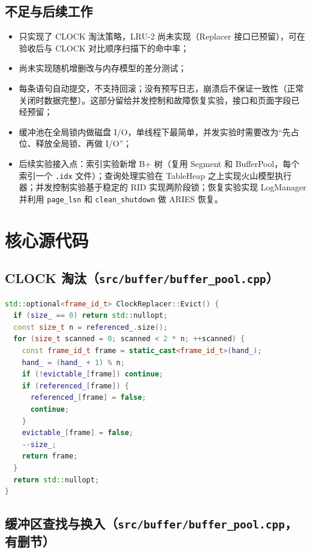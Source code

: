 \documentclass[11pt,a4paper]{ctexart}
\newcommand{\code}[1]{\texttt{#1}}
\begin{document}
\subsection{不足与后续工作}

\begin{itemize}
  \item 只实现了 CLOCK 淘汰策略，LRU-2 尚未实现（Replacer 接口已预留），可在验收后与 CLOCK 对比顺序扫描下的命中率；
  \item 尚未实现随机增删改与内存模型的差分测试；
  \item 每条语句自动提交，不支持回滚；没有预写日志，崩溃后不保证一致性（正常关闭时数据完整）。这部分留给并发控制和故障恢复实验，接口和页面字段已经预留；
  \item 缓冲池在全局锁内做磁盘 I/O，单线程下最简单，并发实验时需要改为“先占位、释放全局锁、再做 I/O”；
  \item 后续实验接入点：索引实验新增 B+ 树（复用 Segment 和 BufferPool，每个索引一个 \code{.idx} 文件）；查询处理实验在 TableHeap 之上实现火山模型执行器；并发控制实验基于稳定的 RID 实现两阶段锁；恢复实验实现 LogManager 并利用 \code{page\_lsn} 和 \code{clean\_shutdown} 做 ARIES 恢复。
\end{itemize}

\appendix
\section{核心源代码}

\subsection{CLOCK 淘汰（\code{src/buffer/buffer\_pool.cpp}）}

\begin{lstlisting}[language=C++]
std::optional<frame_id_t> ClockReplacer::Evict() {
  if (size_ == 0) return std::nullopt;
  const size_t n = referenced_.size();
  for (size_t scanned = 0; scanned < 2 * n; ++scanned) {
    const frame_id_t frame = static_cast<frame_id_t>(hand_);
    hand_ = (hand_ + 1) % n;
    if (!evictable_[frame]) continue;
    if (referenced_[frame]) {
      referenced_[frame] = false;
      continue;
    }
    evictable_[frame] = false;
    --size_;
    return frame;
  }
  return std::nullopt;
}
\end{lstlisting}

\subsection{缓冲区查找与换入（\code{src/buffer/buffer\_pool.cpp}，有删节）}
\end{document}
